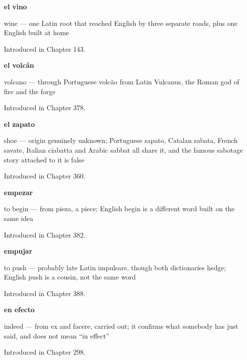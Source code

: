 \noindent\begin{minipage}[t]{\linewidth}
\raggedright
\textbf{el vino}\par
\small wine — one Latin root that reached English by three separate roads, plus one English built at home\par
\footnotesize Introduced in Chapter 143.
\end{minipage}\par\medskip

\noindent\begin{minipage}[t]{\linewidth}
\raggedright
\textbf{el volcán}\par
\small volcano — through Portuguese volcão from Latin Vulcanus, the Roman god of fire and the forge\par
\footnotesize Introduced in Chapter 378.
\end{minipage}\par\medskip

\noindent\begin{minipage}[t]{\linewidth}
\raggedright
\textbf{el zapato}\par
\small shoe — origin genuinely unknown; Portuguese sapato, Catalan sabata, French savate, Italian ciabatta and Arabic sabbat all share it, and the famous sabotage story attached to it is false\par
\footnotesize Introduced in Chapter 360.
\end{minipage}\par\medskip

\noindent\begin{minipage}[t]{\linewidth}
\raggedright
\textbf{empezar}\par
\small to begin — from pieza, a piece; English begin is a different word built on the same idea\par
\footnotesize Introduced in Chapter 382.
\end{minipage}\par\medskip

\noindent\begin{minipage}[t]{\linewidth}
\raggedright
\textbf{empujar}\par
\small to push — probably late Latin impulsare, though both dictionaries hedge; English push is a cousin, not the same word\par
\footnotesize Introduced in Chapter 388.
\end{minipage}\par\medskip

\noindent\begin{minipage}[t]{\linewidth}
\raggedright
\textbf{en efecto}\par
\small indeed — from ex and facere, carried out; it confirms what somebody has just said, and does not mean \textquotedblleft{}in effect\textquotedblright{}\par
\footnotesize Introduced in Chapter 298.
\end{minipage}\par\medskip

